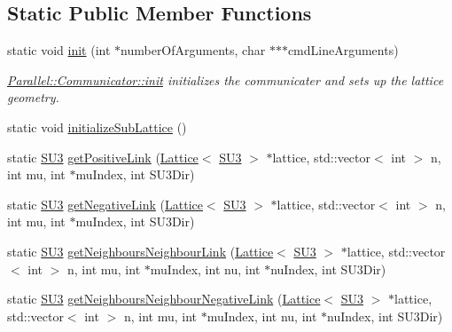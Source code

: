\subsection*{Static Public Member Functions}
\begin{DoxyCompactItemize}
\item 
static void \mbox{\hyperlink{class_parallel_1_1_communicator_a4ed2a77c33cd899b31131e44fc906fd7}{init}} (int $\ast$number\+Of\+Arguments, char $\ast$$\ast$$\ast$cmd\+Line\+Arguments)
\begin{DoxyCompactList}\small\item\em \mbox{\hyperlink{class_parallel_1_1_communicator_a4ed2a77c33cd899b31131e44fc906fd7}{Parallel\+::\+Communicator\+::init}} initializes the communicater and sets up the lattice geometry. \end{DoxyCompactList}\item 
static void \mbox{\hyperlink{class_parallel_1_1_communicator_a3094d713d09225738ecf0250019db115}{initialize\+Sub\+Lattice}} ()
\item 
static \mbox{\hyperlink{class_s_u3}{S\+U3}} \mbox{\hyperlink{class_parallel_1_1_communicator_a1c8d402df4a44becc1cab7a762f51432}{get\+Positive\+Link}} (\mbox{\hyperlink{class_lattice}{Lattice}}$<$ \mbox{\hyperlink{class_s_u3}{S\+U3}} $>$ $\ast$lattice, std\+::vector$<$ int $>$ n, int mu, int $\ast$mu\+Index, int S\+U3\+Dir)
\item 
static \mbox{\hyperlink{class_s_u3}{S\+U3}} \mbox{\hyperlink{class_parallel_1_1_communicator_ae843d16f4aed13d5b5179a05b717ec88}{get\+Negative\+Link}} (\mbox{\hyperlink{class_lattice}{Lattice}}$<$ \mbox{\hyperlink{class_s_u3}{S\+U3}} $>$ $\ast$lattice, std\+::vector$<$ int $>$ n, int mu, int $\ast$mu\+Index, int S\+U3\+Dir)
\item 
static \mbox{\hyperlink{class_s_u3}{S\+U3}} \mbox{\hyperlink{class_parallel_1_1_communicator_a27862560cf6c7b8ccf650a422e014776}{get\+Neighbours\+Neighbour\+Link}} (\mbox{\hyperlink{class_lattice}{Lattice}}$<$ \mbox{\hyperlink{class_s_u3}{S\+U3}} $>$ $\ast$lattice, std\+::vector$<$ int $>$ n, int mu, int $\ast$mu\+Index, int nu, int $\ast$nu\+Index, int S\+U3\+Dir)
\item 
static \mbox{\hyperlink{class_s_u3}{S\+U3}} \mbox{\hyperlink{class_parallel_1_1_communicator_a1c598fae96e05e3b36db368e60453d63}{get\+Neighbours\+Neighbour\+Negative\+Link}} (\mbox{\hyperlink{class_lattice}{Lattice}}$<$ \mbox{\hyperlink{class_s_u3}{S\+U3}} $>$ $\ast$lattice, std\+::vector$<$ int $>$ n, int mu, int $\ast$mu\+Index, int nu, int $\ast$nu\+Index, int S\+U3\+Dir)

\end{DoxyCompactItemize}
